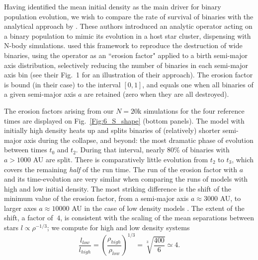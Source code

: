 Having identified the mean initial density as the main driver for binary population evolution, we wish to compare the rate of survival of binaries with the analytical approach by  \cite{Marks2011}. These authors  introduced an analytic operator acting on a binary population to mimic its evolution in  a host star cluster,  dispensing with N-body simulations.  \cite{Marks2012} used this framework to reproduce the destruction of wide binaries, using the operator as an ``erosion  factor" applied to a birth semi-major axis distribution, selectively reducing the number of binaries in each semi-major axis bin (see their Fig.~1 for an illustration of their approach). The erosion factor is bound (in their case) to the interval $[0, 1]$, and equals one when all binaries of a given semi-major axis $a$ are retained (zero when they are all destroyed). 


 The erosion factors arising from our $N = 20$k simulations for the four reference times are displayed on  Fig.~\ref{Fig:6_S_shape} (bottom panels). 
%
The model with initially high density heats up and splits binaries of  (relatively) shorter semi-major axis  during the collapse, and beyond: the most dramatic phase of evolution between times  $t_0$ and $t_2$. During that interval,  nearly 80\% of  binaries with $a > 1000 $ AU are split. There is comparatively little evolution from $t_2$ to $t_3$,  which covers the remaining {\it half} of the run time.  
The run of the erosion factor with $a$  and its time-evolution are very similar  when comparing the runs of models with  high and low initial  density. The most striking difference is the shift of the minimum value of the erosion factor, from a semi-major axis $a \approx 3 000$ AU, to larger axes $a \approx 10 000$ AU  in the case of low density models .  The extent of the shift, a factor of $~4$, is consistent with the scaling of the mean separations between stars $ l \propto \rho^{-1/3}$; we compute for high and low density systems 
\begin{equation}
\frac{l_{low}}{l_{high}} = \left(  \frac{\rho_{high}}{\rho_{low}}\right)^{1/3} = \sqrt[3]{\frac{400}{6}} \simeq 4 .
\end{equation}

